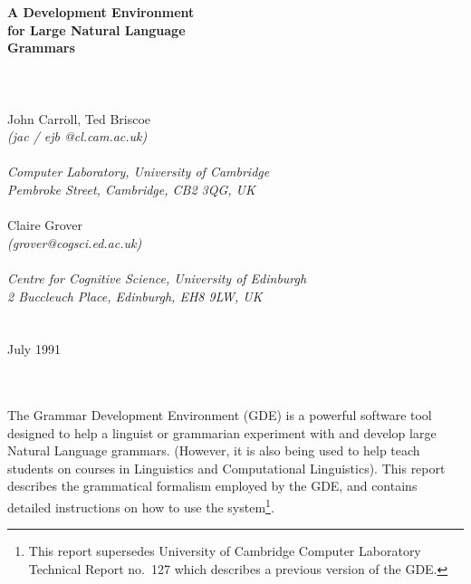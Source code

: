 %
\newenvironment{display}%
   {\begin{center}
    \begin{minipage}[t]{5.4in}}%
   {\end{minipage}
    \end{center}}
%
\newenvironment{ex}%
   {\begin{display}}%
   {\end{display}}
%
\newcommand{\lit}[1]{\underline {#1}}
\newcommand{\la}{$<$}
\newcommand{\ra}{$>$\ }
\newcommand{\ran}{$>$}
\newcommand{\twodash}{$--$}
\newcommand{\littilde}{$\underline {\tilde {\ }}$}
\newcommand{\tilden}{$\tilde {\ }$}
\newcommand{\alt}{$|$\ }
\newcommand{\altn}{$|$}
\newcommand{\cont}{\hspace*{10mm}}
%
 
\begin{center} 
{\Huge\bf A Development Environment\\
for Large Natural Language\\[2.5mm]
Grammars}\\
~\\
~\\
~\\
John Carroll, Ted Briscoe\\
{\it (jac / ejb @cl.cam.ac.uk)}\\ 
~\\
{\it Computer Laboratory, University of Cambridge\\
Pembroke Street, Cambridge, CB2 3QG, UK}\\ 
~\\
Claire Grover\\
{\it (grover@cogsci.ed.ac.uk)}\\
~\\
{\it Centre for Cognitive Science, University of Edinburgh\\
2 Buccleuch Place, Edinburgh, EH8 9LW, UK}\\
~\\
~\\
July 1991\\
~\\
~\\
\end{center}
The Grammar Development Environment (GDE) is a powerful software tool
designed to help a linguist or grammarian experiment with and develop
large Natural Language grammars. (However, it is also being used to
help teach students on courses in Linguistics and Computational
Linguistics). This report describes the grammatical formalism employed
by the GDE, and contains detailed instructions on how to use the
system\footnote{This report
supersedes University of Cambridge Computer Laboratory Technical
Report no.~127 which describes a previous version of the GDE.}.

